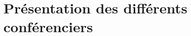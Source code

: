 \documentclass[a4paper, 12pt]{article}
\begin{document}




\section{Présentation des différents conférenciers}















\pagebreak


\end{document}
